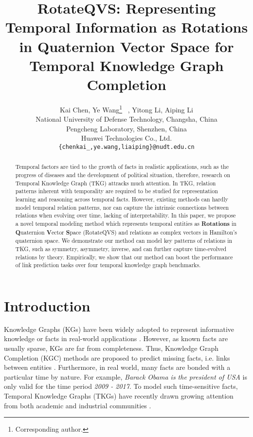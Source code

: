 \documentclass[11pt]{article}
\title{RotateQVS: Representing Temporal Information as Rotations in Quaternion Vector Space for Temporal Knowledge Graph Completion}
\author{
Kai Chen,
Ye Wang\thanks{\quad Corresponding author.} \ ,
Yitong Li,
Aiping Li
\\
National University of Defense Technology, Changsha, China\\
Pengcheng Laboratory, Shenzhen, China\\
Huawei Technologies Co., Ltd.\\
{\small \texttt{\{chenkai\_,ye.wang,liaiping\}@nudt.edu.cn} } \quad {\small \texttt{liyitong3@huawei.com}}
}
\newcommand{\exam}[1]{\emph{#1}\xspace}
\begin{document}
\maketitle
\begin{abstract}
Temporal factors are tied to the growth of facts in realistic applications, such as the progress of diseases and the development of political situation, therefore, research on Temporal Knowledge Graph (TKG) attracks much attention.
In TKG, relation patterns inherent with temporality are required to be studied for representation learning and reasoning across temporal facts.
However, existing methods can hardly model temporal relation patterns, nor can capture the intrinsic connections between relations when evolving over time, lacking of interpretability.
In this paper, we propose a novel temporal modeling method which represents temporal entities as \textbf{Rotations} in \textbf{Q}uaternion \textbf{V}ector \textbf{S}pace (RotateQVS) and relations as complex vectors in Hamilton’s quaternion space.
We demonstrate our method can model key patterns of relations in TKG, such as symmetry, asymmetry, inverse, and can further capture time-evolved relations by theory.
Empirically, we show that our method can boost the performance of link prediction tasks over four temporal knowledge graph benchmarks.
\end{abstract}


\section{Introduction}

Knowledge Graphs (KGs) have been widely adopted to represent informative knowledge or facts in real-world applications \cite{Bollacker2008FreebaseAC,miller1995wordnet,suchanek2007yago}.
However, as known facts are usually sparse, KGs are far from completeness. Thus, Knowledge Graph Completion (KGC) methods are proposed to predict missing facts, i.e. links between entities \cite{bordes2013translating,Yang2015EmbeddingEA,Dettmers2018Convolutional,CIM}.
Furthermore, in real world, many facts are bonded with a particular time by nature.
For example, \exam{Barack Obama is the president of USA} is only valid for the time period \exam{2009 - 2017}.
To model such time-sensitive facts, Temporal Knowledge Graphs (TKGs) have recently drawn growing attention from both academic and industrial communities \cite{lautenschlager2015icews,leetaru2013gdelt}.
\end{document}
